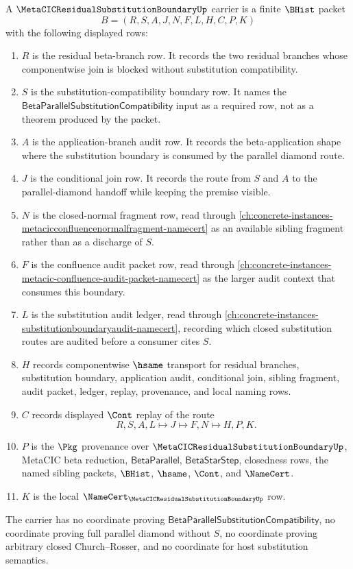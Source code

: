 \begin{definition}
\label{def:metacic-residual-substitution-boundary-carrier}
A $\MetaCICResidualSubstitutionBoundaryUp$ carrier is a finite $\BHist$ packet
$$
B=(R,S,A,J,N,F,L,H,C,P,K)
$$
with the following displayed rows:
\begin{enumerate}
\item $R$ is the residual beta-branch row. It records the two residual branches whose componentwise join is blocked without substitution compatibility.
\item $S$ is the substitution-compatibility boundary row. It names the $\mathsf{BetaParallelSubstitutionCompatibility}$ input as a required row, not as a theorem produced by the packet.
\item $A$ is the application-branch audit row. It records the beta-application shape where the substitution boundary is consumed by the parallel diamond route.
\item $J$ is the conditional join row. It records the route from $S$ and $A$ to the parallel-diamond handoff while keeping the premise visible.
\item $N$ is the closed-normal fragment row, read through \autoref{ch:concrete-instances-metacicconfluencenormalfragment-namecert} as an available sibling fragment rather than as a discharge of $S$.
\item $F$ is the confluence audit packet row, read through \autoref{ch:concrete-instances-metacic-confluence-audit-packet-namecert} as the larger audit context that consumes this boundary.
\item $L$ is the substitution audit ledger, read through \autoref{ch:concrete-instances-substitutionboundaryaudit-namecert}, recording which closed substitution routes are audited before a consumer cites $S$.
\item $H$ records componentwise $\hsame$ transport for residual branches, substitution boundary, application audit, conditional join, sibling fragment, audit packet, ledger, replay, provenance, and local naming rows.
\item $C$ records displayed $\Cont$ replay of the route
$$
R,S,A,L \longmapsto J \longmapsto F,N \longmapsto H,P,K .
$$
\item $P$ is the $\Pkg$ provenance over $\MetaCICResidualSubstitutionBoundaryUp$, MetaCIC beta reduction, $\mathsf{BetaParallel}$, $\mathsf{BetaStarStep}$, closedness rows, the named sibling packets, $\BHist$, $\hsame$, $\Cont$, and $\NameCert$.
\item $K$ is the local $\NameCert_{\MetaCICResidualSubstitutionBoundaryUp}$ row.
\end{enumerate}
The carrier has no coordinate proving $\mathsf{BetaParallelSubstitutionCompatibility}$, no coordinate proving full parallel diamond without $S$, no coordinate proving arbitrary closed Church--Rosser, and no coordinate for host substitution semantics.
\end{definition}

